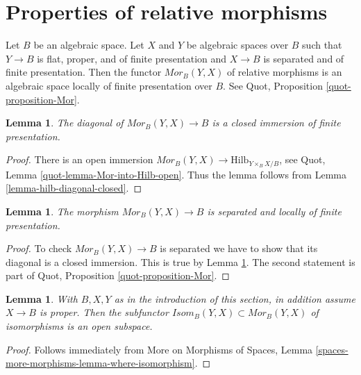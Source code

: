 \documentclass{stacks-project}
\theoremstyle{plain}
\newtheorem{lemma}[subsection]{Lemma}
\theoremstyle{definition}
\theoremstyle{remark}
\numberwithin{equation}{subsection}
\def\Hilbfunctor{\mathrm{Hilb}}
\begin{document}
\section{Properties of relative morphisms}
\label{section-relative-morphisms}

\noindent
Let $B$ be an algebraic space. Let $X$ and $Y$ be algebraic spaces
over $B$ such that $Y \to B$ is flat, proper, and of finite presentation
and $X \to B$ is separated and of finite presentation.
Then the functor $\mathit{Mor}_B(Y, X)$ of relative morphisms
is an algebraic space locally of finite presentation over $B$.
See Quot, Proposition \ref{quot-proposition-Mor}.

\begin{lemma}
\label{lemma-Mor-diagonal-closed}
The diagonal of $\mathit{Mor}_B(Y, X) \to B$ is a closed immersion
of finite presentation.
\end{lemma}

\begin{proof}
There is an open immersion
$\mathit{Mor}_B(Y, X) \to \Hilbfunctor_{Y \times_B X/B}$, see
Quot, Lemma \ref{quot-lemma-Mor-into-Hilb-open}.
Thus the lemma follows from
Lemma \ref{lemma-hilb-diagonal-closed}.
\end{proof}

\begin{lemma}
\label{lemma-Mor-s-lfp}
The morphism $\mathit{Mor}_B(Y, X) \to B$ is separated
and locally of finite presentation.
\end{lemma}

\begin{proof}
To check $\mathit{Mor}_B(Y, X) \to B$ is separated we have to
show that its diagonal is a closed immersion. This
is true by Lemma \ref{lemma-Mor-diagonal-closed}.
The second statement is part of
Quot, Proposition \ref{quot-proposition-Mor}.
\end{proof}

\begin{lemma}
\label{lemma-Isom-in-Mor}
With $B, X, Y$ as in the introduction of this section, in addition
assume $X \to B$ is proper. Then the
subfunctor $\mathit{Isom}_B(Y, X) \subset \mathit{Mor}_B(Y, X)$
of isomorphisms is an open subspace.
\end{lemma}

\begin{proof}
Follows immediately from More on Morphisms of Spaces, Lemma
\ref{spaces-more-morphisms-lemma-where-isomorphism}.
\end{proof}
\end{document}
